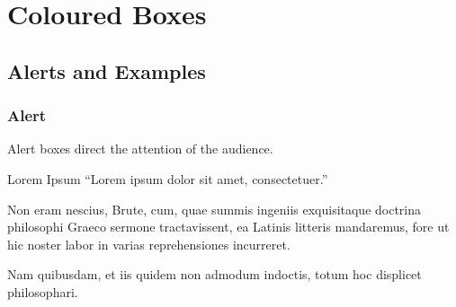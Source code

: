 \documentclass{beamer}
\begin{document}









\section{Coloured Boxes}

\subsection{Alerts and Examples}

\begin{frame}
  \frametitle{Alert}

  Alert boxes direct the attention of the audience.

  \begin{alertblock}{Lorem Ipsum}
    ``Lorem ipsum dolor sit amet, consectetuer.''
  \end{alertblock}
  
  \pause
  Non eram nescius, Brute, cum, quae summis ingeniis exquisitaque doctrina
  philosophi Graeco sermone tractavissent, ea Latinis litteris mandaremus, fore
  ut hic noster labor in varias reprehensiones incurreret.

  Nam quibusdam, et iis quidem non admodum indoctis, totum hoc displicet philosophari.
\end{frame}
\end{document}
